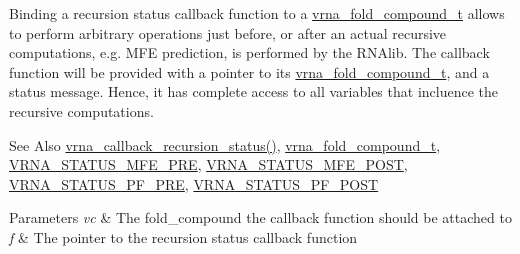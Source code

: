 Binding a recursion status callback function to a \hyperlink{group__fold__compound_ga1b0cef17fd40466cef5968eaeeff6166}{vrna\-\_\-fold\-\_\-compound\-\_\-t} allows to perform arbitrary operations just before, or after an actual recursive computations, e.\-g. M\-F\-E prediction, is performed by the R\-N\-Alib. The callback function will be provided with a pointer to its \hyperlink{group__fold__compound_ga1b0cef17fd40466cef5968eaeeff6166}{vrna\-\_\-fold\-\_\-compound\-\_\-t}, and a status message. Hence, it has complete access to all variables that incluence the recursive computations.

\begin{DoxySeeAlso}{See Also}
\hyperlink{group__fold__compound_ga9fafb3f0217e27339bb9faf61a03e723}{vrna\-\_\-callback\-\_\-recursion\-\_\-status()}, \hyperlink{group__fold__compound_ga1b0cef17fd40466cef5968eaeeff6166}{vrna\-\_\-fold\-\_\-compound\-\_\-t}, \hyperlink{group__fold__compound_ga1a5053dc8acbb0111e852988726f07d6}{V\-R\-N\-A\-\_\-\-S\-T\-A\-T\-U\-S\-\_\-\-M\-F\-E\-\_\-\-P\-R\-E}, \hyperlink{group__fold__compound_ga47c900ca76e56e59e2e83a06e0bde641}{V\-R\-N\-A\-\_\-\-S\-T\-A\-T\-U\-S\-\_\-\-M\-F\-E\-\_\-\-P\-O\-S\-T}, \hyperlink{group__fold__compound_ga91795d35ebdb6f32be50459f24b3d114}{V\-R\-N\-A\-\_\-\-S\-T\-A\-T\-U\-S\-\_\-\-P\-F\-\_\-\-P\-R\-E}, \hyperlink{group__fold__compound_ga1c6fa243533fd026e50f7d595eaaa565}{V\-R\-N\-A\-\_\-\-S\-T\-A\-T\-U\-S\-\_\-\-P\-F\-\_\-\-P\-O\-S\-T}
\end{DoxySeeAlso}

\begin{DoxyParams}{Parameters}
{\em vc} & The fold\-\_\-compound the callback function should be attached to \\
\hline
{\em f} & The pointer to the recursion status callback function \\
\hline
\end{DoxyParams}
